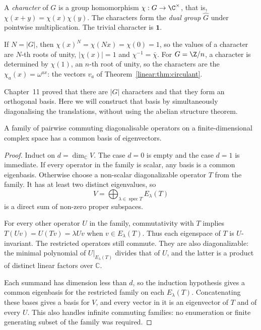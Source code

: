 \begin{definition}\label{linear:def:character}
A \emph{character} of $G$ is a group homomorphism $\chi:G\to\C^\times$, that is, $\chi(x+y)=\chi(x)\chi(y)$. The characters form
the \emph{dual group} $\widehat G$ under pointwise multiplication. The trivial character is $\mathbf 1$.
\end{definition}

If $N=|G|$, then $\chi(x)^N=\chi(Nx)=\chi(0)=1$, so the values of a character are $N$-th roots of unity, $|\chi(x)|=1$ and
$\chi^{-1}=\bar\chi$. For $G=\Z/n$, a character is determined by $\chi(1)$, an $n$-th root of unity, so the characters are the
$\chi_a(x)=\omega^{ax}$: the vectors $v_a$ of Theorem~\ref{linear:thm:circulant}.

Chapter~11 proved that there are $|G|$ characters and that they form an
orthogonal basis. Here we will construct that basis by simultaneously
diagonalising the translations, without using the abelian structure theorem.

\begin{lemma}\label{linear:lem:commuting}
A family of pairwise commuting diagonalisable operators on a finite-dimensional complex space has a common basis of eigenvectors.
\end{lemma}
\begin{proof}
Induct on $d=\dim_{\mathbb C}V$. The case $d=0$
is empty and the case $d=1$ is immediate.
If every operator in the family is scalar,
any basis is a common eigenbasis.
Otherwise choose a non-scalar diagonalizable
operator $T$ from the family. It has at least
two distinct eigenvalues, so
\[
V=\bigoplus_{\lambda\in\operatorname{spec}T}
E_\lambda(T)
\]
is a direct sum of non-zero proper subspaces.

For every other operator $U$ in the family,
commutativity with $T$ implies
$T(Uv)=U(Tv)=\lambda Uv$ when $v\in E_\lambda(T)$.
Thus each eigenspace of $T$ is $U$-invariant.
The restricted operators still commute.
They are also diagonalizable: the minimal
polynomial of $U|_{E_\lambda(T)}$ divides
that of $U$, and the latter is a product
of distinct linear factors over $\mathbb C$.

Each summand has dimension less than $d$,
so the induction hypothesis gives a common
eigenbasis for the restricted family on
each $E_\lambda(T)$. Concatenating these
bases gives a basis for $V$, and every
vector in it is an eigenvector of $T$ and
of every $U$. This also handles infinite
commuting families: no enumeration or finite
generating subset of the family was required.
\end{proof}

